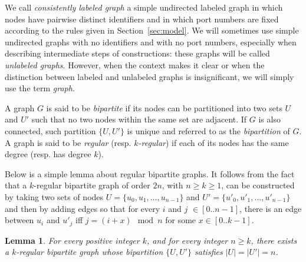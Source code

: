 \documentclass[11pt]{article}
\newtheorem{lemma}{Lemma}[section]
\newcommand{\qed}{\hfill $\Box$ \bigbreak}
\newenvironment{proof}{\noindent {\bf Proof.}}{\qed}
\begin{document}
We call \emph{consistently labeled graph} a simple undirected labeled
graph in which nodes have pairwise distinct identifiers and in which
port numbers are fixed according to the rules given in
Section~\ref{sec:model}. We will sometimes use simple undirected
graphs with no identifiers and with no port numbers, especially when
describing intermediate steps of constructions: these graphs will be
called \emph{unlabeled graphs}. However, when the context makes it
clear or when the distinction between labeled and unlabeled graphs is
insignificant, we will simply use the term \emph{graph}.

A graph $G$ is said to be \emph{bipartite} if its nodes can be
partitioned into two sets $U$ and $U'$ such that no two nodes within
the same set are adjacent. If $G$ is also connected, such partition
$\{U,U'\}$ is unique and referred to as the \emph{bipartition} of $G$.
A graph is said to be \emph{regular} (resp. \emph{$k$-regular})
if each of its nodes has the same degree (resp. has degree
$k$). 

Below is a simple lemma about regular bipartite graphs. It follows from the fact that a $k$-regular bipartite graph of order $2n$, with $n\geq k\geq 1$, can be constructed by taking two sets of nodes $U=\{u_0,u_1,\ldots,u_{n-1}\}$ and $U'=\{u'_0,u'_1,\ldots,u'_{n-1}\}$ and then by adding edges so that for every $i$ and $j$ $\in [0..n-1]$, there is an edge between $u_i$ and $u'_j$ iff $j=(i+x)\mod n$ for some $x\in [0..k-1]$.
\begin{lemma}
\label{lem:biexist}
For every positive integer $k$, and for every integer $n\geq k$, there
exists a $k$-regular bipartite graph whose bipartition $\{U,U'\}$ satisfies $|U|=|U'|=n$.
\end{lemma}

\end{document}
